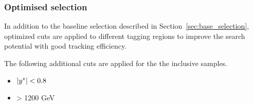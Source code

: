 %
%
\subsubsection{Optimised selection}
\label{sec:analysiscuts}

In addition to the baseline selection described in Section~\ref{sec:base_selection}, optimized cuts are  applied to different tagging regions to improve the search potential with good tracking efficiency. 

The following additional cuts are applied for the the inclusive samples.
\begin{itemize}
	\item $|y^\ast| < 0.8$
	\item \mjj > 1200 GeV
\end{itemize}

